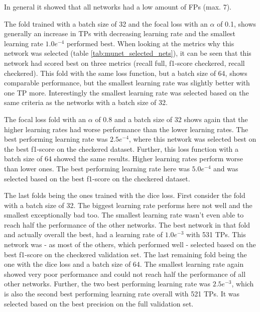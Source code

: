 In general it showed that all networks had a low amount of \acp{FP} (max. 7).

The fold trained with a batch size of 32 and the focal loss with an $\alpha$ of 0.1, shows generally an increase in \acp{TP} with decreasing learning rate and the smallest learning rate $1.0e^{-4}$ performed best.
When looking at the metrics why this network was selected (table \ref{tab:munet_selected_nets}), it can be seen that this network had scored best on three metrics (recall full, f1-score checkered, recall checkered).
This fold with the same loss function, but a batch size of 64, shows comparable performance, but the smallest learning rate was slightly better with one \ac{TP} more.
Interestingly the smallest learning rate was selected based on the same criteria as the networks with a batch size of 32.

The focal loss fold with an $\alpha$ of 0.8 and a batch size of 32 shows again that the higher learning rates had worse performance than the lower learning rates.
The best performing learning rate was $2.5e^{-4}$, where this network was selected best on the best f1-score on the checkered dataset.
Further, this loss function with a batch size of 64 showed the same results.
Higher learning rates perform worse than lower ones.
The best performing learning rate here was $5.0e^{-4}$ and was selected based on the best f1-score on the checkered dataset.

The last folds being the ones trained with the dice loss.
First consider the fold with a batch size of 32.
The biggest learning rate performs here not well and the smallest exceptionally bad too.
The smallest learning rate wasn't even able to reach half the performance of the other networks.
The best network in that fold and actually overall the best, had a learning rate of $1.0e^{-3}$ with 531 \acp{TP}.
This network was - as most of the others, which performed well - selected based on the best f1-score on the checkered validation set.
The last remaining fold being the one with the dice loss and a batch size of 64.
The smallest learning rate again showed very poor performance and could not reach half the performance of all other networks.
Further, the two best performing learning rate was $2.5e^{-3}$, which is also the second best performing learning rate overall with 521 \acp{TP}.
It was selected based on the best precision on the full validation set.


